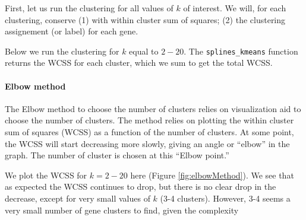 \documentclass[9pt,a4paper,]{extarticle}
\newenvironment{Shaded}{\begin{snugshade}}{\end{snugshade}}
\newcommand{\ControlFlowTok}[1]{\textcolor[rgb]{0.13,0.29,0.53}{\textbf{#1}}}
\newcommand{\DataTypeTok}[1]{\textcolor[rgb]{0.13,0.29,0.53}{#1}}
\newcommand{\DecValTok}[1]{\textcolor[rgb]{0.00,0.00,0.81}{#1}}
\newcommand{\KeywordTok}[1]{\textcolor[rgb]{0.13,0.29,0.53}{\textbf{#1}}}
\newcommand{\NormalTok}[1]{#1}
\newcommand{\OperatorTok}[1]{\textcolor[rgb]{0.81,0.36,0.00}{\textbf{#1}}}
\newcommand{\StringTok}[1]{\textcolor[rgb]{0.31,0.60,0.02}{#1}}
\begin{document}
First, let us run the clustering for all values of \(k\) of interest. We
will, for each clustering, conserve (1) with within cluster sum of
squares; (2) the clustering assignement (or label) for each gene.

Below we run the clustering for \(k\) equal to \(2-20\). The \texttt{splines\_kmeans}
function returns the WCSS for each cluster, which we sum to get the total
WCSS.

\begin{Shaded}
\end{Shaded}

\hypertarget{elbow-method}{%
\paragraph{Elbow method}\label{elbow-method}}

The Elbow method to choose the number of clusters relies on visualization aid
to choose the number of clusters. The method relies on plotting the within
cluster sum of squares (WCSS) as a function of the number of clusters. At some
point, the WCSS will start decreasing more slowly, giving an angle or ``elbow''
in the graph. The number of cluster is chosen at this ``Elbow point.''

We plot the WCSS for \(k=2-20\) here (Figure \ref{fig:elbowMethod}).
We see that as expected the WCSS continues
to drop, but there is no clear drop in the decrease, except for very small
values of \(k\) (3-4 clusters). However, 3-4 seems a very small number of gene
clusters to find, given the complexity
\end{document}

